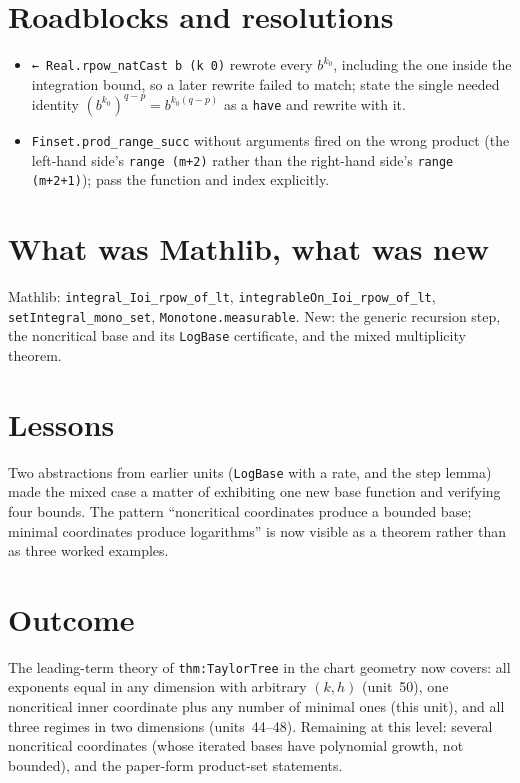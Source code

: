 \documentclass[11pt]{article}
\begin{document}
\section{Roadblocks and resolutions}
\begin{itemize}
\item \texttt{← Real.rpow\_natCast b (k 0)} rewrote every $b^{k_0}$, including the one inside the
integration bound, so a later rewrite failed to match; state the single needed identity
$(b^{k_0})^{q-p}=b^{k_0(q-p)}$ as a \texttt{have} and rewrite with it.
\item \texttt{Finset.prod\_range\_succ} without arguments fired on the wrong product (the
left-hand side's \texttt{range (m+2)} rather than the right-hand side's \texttt{range (m+2+1)});
pass the function and index explicitly.
\end{itemize}

\section{What was Mathlib, what was new}
Mathlib: \texttt{integral\_Ioi\_rpow\_of\_lt}, \texttt{integrableOn\_Ioi\_rpow\_of\_lt},
\texttt{setIntegral\_mono\_set}, \texttt{Monotone.measurable}. New: the generic recursion step,
the noncritical base and its \texttt{LogBase} certificate, and the mixed multiplicity theorem.

\section{Lessons}
Two abstractions from earlier units (\texttt{LogBase} with a rate, and the step lemma) made the mixed
case a matter of exhibiting one new base function and verifying four bounds. The pattern
``noncritical coordinates produce a bounded base; minimal coordinates produce logarithms'' is now
visible as a theorem rather than as three worked examples.

\section{Outcome}
The leading-term theory of \texttt{thm:TaylorTree} in the chart geometry now covers: all exponents
equal in any dimension with arbitrary $(k,h)$ (unit~50), one noncritical inner coordinate plus any
number of minimal ones (this unit), and all three regimes in two dimensions (units~44--48). Remaining
at this level: several noncritical coordinates (whose iterated bases have polynomial growth, not
bounded), and the paper-form product-set statements.
\end{document}
